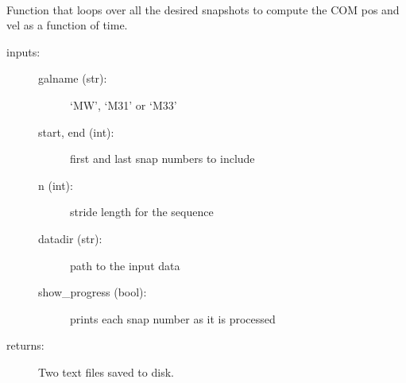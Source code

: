 \documentclass[letterpaper,10pt,english]{sphinxmanual}
\begin{document}
\begin{fulllineitems}
\label{\detokenize{timecourse:galaxy.timecourse.TimeCourse}}~

\begin{fulllineitems}
\label{\detokenize{timecourse:galaxy.timecourse.TimeCourse.write_com_ang_mom}}
Function that loops over all the desired snapshots to compute the COM pos and vel as a 
function of time.
\begin{description}
\item[{inputs:}] \leavevmode\begin{description}
\item[{galname (str):}] \leavevmode
‘MW’, ‘M31’ or ‘M33’

\item[{start, end (int):}] \leavevmode
first and last snap numbers to include

\item[{n (int):}] \leavevmode
stride length for the sequence

\item[{datadir (str):}] \leavevmode
path to the input data

\item[{show\_progress (bool):}] \leavevmode
prints each snap number as it is processed

\end{description}

\item[{returns: }] \leavevmode
Two text files saved to disk.

\end{description}

\end{fulllineitems}



\end{fulllineitems}
\end{document}
